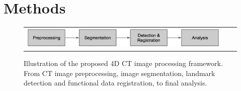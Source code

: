\section{Methods}
\label{sec:methods}
\begin{figure}[tb]
  \begin{center}
    \begin{tabular}{ccc}
    \includegraphics[width=\figfullwidth] {fig/framework.png}
    \end{tabular}
    \caption{ \label{fig:framework} Illustration of the proposed 4D CT image processing framework. From CT image preprocessing, image segmentation, landmark detection and functional data registration, to final analysis.
    }
  \end{center}
\end{figure}

